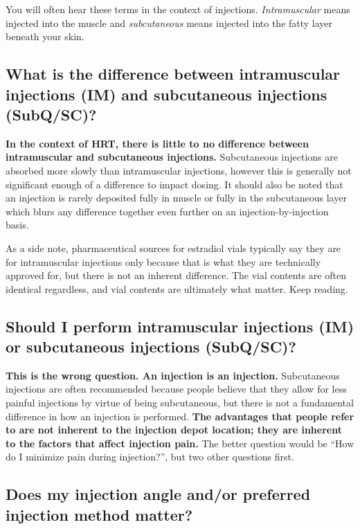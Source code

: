 \documentclass{article}
\begin{document}
You will often hear these terms in the context of injections. \textit{Intramuscular} means injected into the muscle and \textit{subcutaneous} means injected into the fatty layer beneath your skin.

\subsection{What is the difference between intramuscular injections (IM) and subcutaneous injections (SubQ/SC)?}

\textbf{In the context of HRT, there is little to no difference between intramuscular and subcutaneous injections.} Subcutaneous injections are absorbed more slowly than intramuscular injections, however this is generally not significant enough of a difference to impact dosing. It should also be noted that an injection is rarely deposited fully in muscle or fully in the subcutaneous layer which blurs any difference together even further on an injection-by-injection basis.

As a side note, pharmaceutical sources for estradiol vials typically say they are for intramuscular injections only because that is what they are technically approved for, but there is not an inherent difference. The vial contents are often identical regardless, and vial contents are ultimately what matter. Keep reading.

\subsection{Should I perform intramuscular injections (IM) or subcutaneous injections (SubQ/SC)?}

\textbf{This is the wrong question. An injection is an injection.} Subcutaneous injections are often recommended because people believe that they allow for less painful injections by virtue of being subcutaneous, but there is not a fundamental difference in how an injection is performed. \textbf{The advantages that people refer to are not inherent to the injection depot location; they are inherent to the factors that affect injection pain.} The better question would be “How do I minimize pain during injection?”, but two other questions first.

\subsection{Does my injection angle and/or preferred injection method matter?}\label{5-9}
\end{document}
